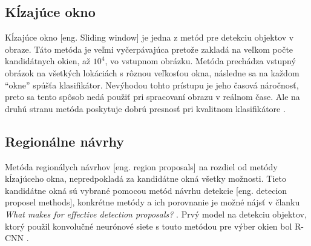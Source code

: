 \begin{comment}
    \subsubsection{Vyhľadávač na základe vizuálnej podobnosti obrázkov}
    Jednu z možných aplikácií detekcie objektov v obraze využíva Pinterest\footnote{\url{https://medium.com/@Pinterest_Engineering/introducing-automatic-object-detection-to-visual-search-e57c29191c30}}.
    Používaju detekciu objektov pre indexovanie rôznych častí obrázka.
    Týmto spôsobom si môže užívateľ pri hľadaní napr. špecifickej kabelky alebo topánok nájsť aj jej podobné.
    \begin{figure}[H]
        \centering
        \texttt{[image: purse]}
        \caption{Prototyp automatického označovania a vyhľadávania objektov \cite{odkaz:ObjectDetectionOverview}}
        \label{pic:kNN}
    \end{figure}
\end{comment}

\subsection{Kĺzajúce okno}
\label{subsec:slidingwindow}
Kĺzajúce okno [eng. Sliding window] je jedna z metód pre detekciu objektov v obraze.
Táto metóda je veľmi vyčerpávajúca pretože zakladá na veľkom počte kandidátnych okien, až $10^4$, vo vstupnom obrázku.
Metóda prechádza vstupný obrázok na všetkých lokáciách s rôznou veľkosťou okna, následne sa na každom ``okne'' spúšťa klasifikátor.
Nevýhodou tohto prístupu je jeho časová náročnosť, preto sa tento spôsob nedá použiť pri spracovaní obrazu v reálnom čase.
Ale na druhú stranu metóda poskytuje dobrú presnosť pri kvalitnom klasifikátore \cite{prop:AutomaticHandgunDetection}.

\subsection{Regionálne návrhy}
\label{subsec:regionproposal}
Metóda regionálych návrhov [eng. region proposals] na rozdiel od metódy kĺzajúceho okna, nepredpokladá za kandidátne okná všetky možnosti.
Tieto kandidátne okná sú vybrané pomocou metód návrhu detekcie [eng. detecion proposel methods], konkrétne metódy
    a ich porovnanie je možné nájsť v članku \textit{What makes for effective detection proposals?} \cite{prop:ProposalMethods}.
Prvý model na detekciu objektov, ktorý použil konvolučné neurónové siete s touto metódou pre výber okien bol R-CNN \cite{prop:AutomaticHandgunDetection}.
